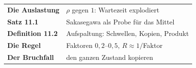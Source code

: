 \begin{merksatz}
\begin{center}
\renewcommand{\arraystretch}{1.5}
\begin{tabular}{@{}P{3.0cm}P{5.6cm}@{}}
\toprule
\textbf{Die Auslastung} & $\rho$ gegen $1$: Wartezeit explodiert\\
\textbf{Satz 11.1} & Sakasegawa als Probe für das Mittel\\
\textbf{Definition 11.2} & Aufspaltung: Schwellen, Kopien, Produkt\\
\textbf{Die Regel} & Faktoren $0{,}2$--$0{,}5$, $R\approx1/$Faktor\\
\textbf{Der Bruchfall} & den ganzen Zustand kopieren\\
\bottomrule
\end{tabular}
\end{center}

\begin{center}
\begin{minipage}{0.88\textwidth}
\end{minipage}
\end{center}
\end{merksatz}
